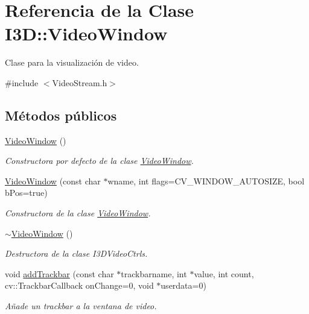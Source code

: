 \hypertarget{class_i3_d_1_1_video_window}{}\section{Referencia de la Clase I3D\+:\+:Video\+Window}
\label{class_i3_d_1_1_video_window}


Clase para la visualización de video.  




{\ttfamily \#include $<$Video\+Stream.\+h$>$}

\subsection*{Métodos públicos}
\begin{DoxyCompactItemize}
\item 
\hyperlink{class_i3_d_1_1_video_window_a51fb6d6843af62d263fb9a5298848174}{Video\+Window} ()
\begin{DoxyCompactList}\small\item\em Constructora por defecto de la clase \hyperlink{class_i3_d_1_1_video_window}{Video\+Window}. \end{DoxyCompactList}\item 
\hyperlink{class_i3_d_1_1_video_window_a7afe024dc5a6307365337654ea77dc00}{Video\+Window} (const char $\ast$wname, int flags=C\+V\+\_\+\+W\+I\+N\+D\+O\+W\+\_\+\+A\+U\+T\+O\+S\+I\+ZE, bool b\+Pos=true)
\begin{DoxyCompactList}\small\item\em Constructora de la clase \hyperlink{class_i3_d_1_1_video_window}{Video\+Window}. \end{DoxyCompactList}\item 
\hyperlink{class_i3_d_1_1_video_window_aefc6ce650f9c97139e7ed503eaffcfe3}{$\sim$\+Video\+Window} ()
\begin{DoxyCompactList}\small\item\em Destructora de la clase I3\+D\+Video\+Ctrls. \end{DoxyCompactList}\item 
void \hyperlink{class_i3_d_1_1_video_window_a680108ddb2b671101e2486b9720434a5}{add\+Trackbar} (const char $\ast$trackbarname, int $\ast$value, int count, cv\+::\+Trackbar\+Callback on\+Change=0, void $\ast$userdata=0)
\begin{DoxyCompactList}\small\item\em Añade un trackbar a la ventana de video. \end{DoxyCompactList}\item 

\end{DoxyCompactItemize}
